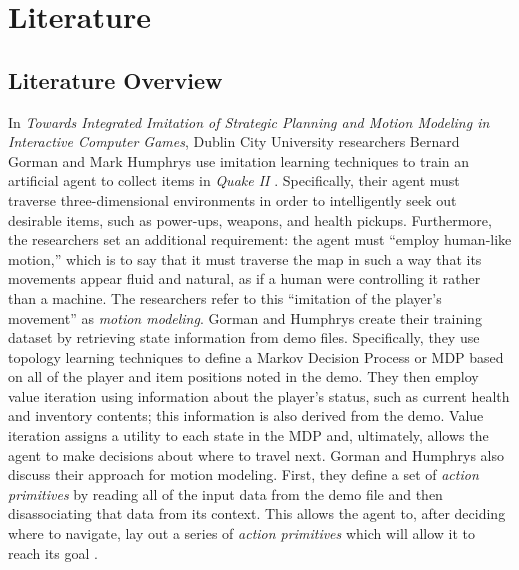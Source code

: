 \chapter{Literature}
\label{ch:Literature}



\section{Literature Overview}

In {\it Towards Integrated Imitation of Strategic Planning and Motion Modeling in Interactive Computer Games}, Dublin City University researchers Bernard Gorman and Mark Humphrys use imitation learning techniques to train an artificial agent to collect items in {\it Quake II} \cite{Gorman:2006}. Specifically, their agent must traverse three-dimensional environments in order to intelligently seek out desirable items, such as power-ups, weapons, and health pickups. Furthermore, the researchers set an additional requirement: the agent must ``employ human-like motion,'' which is to say that it must traverse the map in such a way that its movements appear fluid and natural, as if a human were controlling it rather than a machine. The researchers refer to this ``imitation of the player's movement'' as {\it motion modeling}. Gorman and Humphrys create their training dataset by retrieving state information from demo files. Specifically, they use topology learning techniques to define a Markov Decision Process or MDP based on all of the player and item positions noted in the demo. They then employ value iteration using information about the player's status, such as current health and inventory contents; this information is also derived from the demo. Value iteration assigns a utility to each state in the MDP and, ultimately, allows the agent to make decisions about where to travel next. Gorman and Humphrys also discuss their approach for motion modeling. First, they define a set of {\it action primitives} by reading all of the input data from the demo file and then disassociating that data from its context. This allows the agent to, after deciding where to navigate, lay out a series of {\it action primitives} which will allow it to reach its goal \cite{Gorman:2006}.


